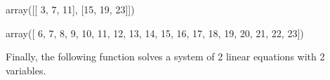 \documentclass[letterpaper,10pt,english]{sphinxmanual}
\begin{document}
\begin{sphinxVerbatim}[commandchars=\\\{\}]
array([[ 3,  7, 11],
       [15, 19, 23]])
\end{sphinxVerbatim}

\begin{sphinxVerbatim}[commandchars=\\\{\}]
\PYG{p}{[}\PYG{p}{]}  
\end{sphinxVerbatim}

\begin{sphinxVerbatim}[commandchars=\\\{\}]
array([ 6,  7,  8,  9, 10, 11, 12, 13, 14, 15, 16, 17, 18, 19, 20, 21, 22,
       23])
\end{sphinxVerbatim}

Finally, the following function solves a system of 2 linear equations with 2 variables.
\end{document}
